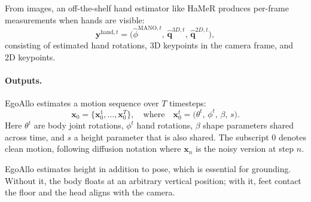 From images, an off-the-shelf hand estimator like HaMeR
\citep{pavlakos2023hamer} produces per-frame measurements when hands
are visible:
\begin{equation}
    \boldsymbol{y}^{\text{hand},t} = \big(\hat{\phi}^{\text{MANO},t},\,
    \hat{\boldsymbol{q}}^{3D,t},\, \hat{\boldsymbol{q}}^{2D,t}\big),
\end{equation}
consisting of estimated hand rotations, 3D keypoints in the camera
frame, and 2D keypoints.

\paragraph{Outputs.}
EgoAllo estimates a motion sequence over $T$ timesteps:
\begin{equation}
    \boldsymbol{x}_0 = \{\boldsymbol{x}_0^{1}, \dots, \boldsymbol{x}_0^{T}\},
    \quad\text{where}\quad
    \boldsymbol{x}_0^{t} = \big(\theta^t,\, \phi^t,\, \beta,\, s\big).
\end{equation}
Here $\theta^t$ are body joint rotations, $\phi^t$ hand rotations,
$\beta$ shape parameters shared across time, and $s$ a height
parameter that is also shared. The subscript $0$ denotes clean
motion, following diffusion notation where $\boldsymbol{x}_n$ is the noisy
version at step $n$.

EgoAllo estimates height in addition to pose, which is essential for
grounding. Without it, the body floats at an arbitrary vertical
position; with it, feet contact the floor and the head aligns with the camera.

